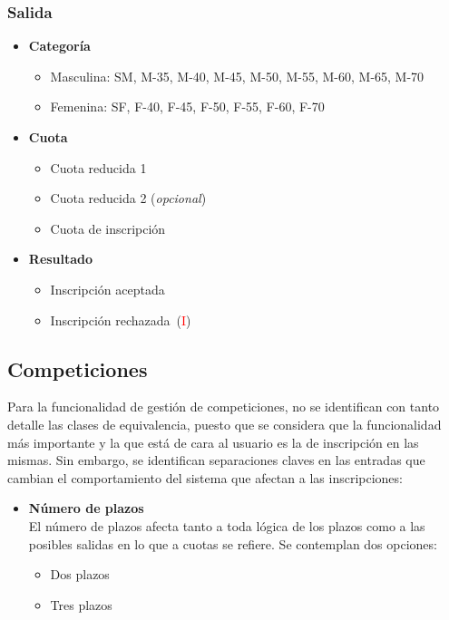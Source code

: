 \subsubsection{Salida}
\begin{itemize}
	\item \textbf{Categoría}
		\begin{itemize}
			\item Masculina: SM, M-35, M-40, M-45, M-50, M-55, M-60, M-65, M-70
			\item Femenina: SF, F-40, F-45, F-50, F-55, F-60, F-70
		\end{itemize}
	\item \textbf{Cuota}
		\begin{itemize}
			\item Cuota reducida 1
			\item Cuota reducida 2 (\textit{opcional})
			\item Cuota de inscripción
		\end{itemize}
	\item \textbf{Resultado}
		\begin{itemize}
			\item Inscripción aceptada
			\item Inscripción rechazada~(\textcolor{red}{I})
		\end{itemize}
\end{itemize}
\newpage{}
\subsection{Competiciones}
Para la funcionalidad de gestión de competiciones, no se identifican con tanto detalle las
clases de equivalencia, puesto que se considera que la funcionalidad más importante y la que
está de cara al usuario es la de inscripción en las mismas. Sin embargo, se identifican
separaciones claves en las entradas que cambian el comportamiento del sistema que afectan a
las inscripciones:

\begin{itemize}
	\item \textbf{Número de plazos}
		\\ El número de plazos afecta tanto a toda lógica de los plazos como a las posibles
		salidas en lo que a cuotas se refiere. Se contemplan dos opciones: \begin{itemize}
			\item Dos plazos
			\item Tres plazos
		\end{itemize}
\end{itemize}

